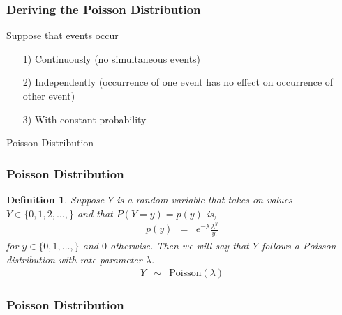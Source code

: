 \documentclass{beamer}
\newtheorem{defn}{Definition}
\begin{document}
\begin{frame}
\frametitle{Deriving the Poisson Distribution}

Suppose that events occur
\begin{itemize}
\item[1)] Continuously (no simultaneous events)
\item[2)] Independently (occurrence of one event has no effect on occurrence of other event)
\item[3)] With constant probability
\end{itemize}

\alert{Poisson Distribution}



\end{frame}



\begin{frame}
\frametitle{Poisson Distribution}

\begin{defn}
Suppose $Y$ is a random variable that takes on values $Y \in \{0, 1, 2, \hdots, \}$ and that $P(Y = y) = p(y)$ is,
\begin{eqnarray}
p(y) & = & e^{-\lambda} \frac{\lambda^{y}}{y!} \nonumber
\end{eqnarray}
for $y \in \{0, 1, \hdots, \}$ and $0$ otherwise.  Then we will say that $Y$ follows a \alert{Poisson} distribution with \alert{rate} parameter $\lambda$.  \\
\begin{eqnarray}
Y & \sim & \text{Poisson}(\lambda) \nonumber
\end{eqnarray}

\end{defn}




\end{frame}



\begin{frame}
\frametitle{Poisson Distribution}





\end{frame}
\end{document}
